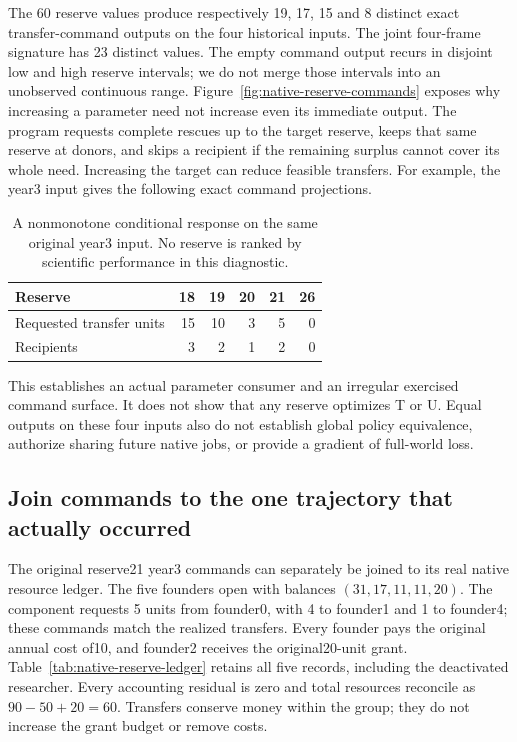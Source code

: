 The 60 reserve values produce respectively 19, 17, 15 and 8 distinct exact
transfer-command outputs on the four historical inputs. The joint four-frame
signature has 23 distinct values. The empty command output recurs in disjoint
low and high reserve intervals; we do not merge those intervals into an
unobserved continuous range. Figure~\ref{fig:native-reserve-commands} exposes
why increasing a parameter need not increase even its immediate output. The
program requests complete rescues up to the target reserve, keeps that same
reserve at donors, and skips a recipient if the remaining surplus cannot
cover its whole need. Increasing the target can reduce feasible transfers.
For example, the year3 input gives the following exact command projections.

\begin{table}[t]
\centering\small
\begin{tabular}{lrrrrr}
\toprule
Reserve &18&19&20&21&26\\
\midrule
Requested transfer units &15&10&3&5&0\\
Recipients &3&2&1&2&0\\
\bottomrule
\end{tabular}
\caption{A nonmonotone conditional response on the same original year3 input.
No reserve is ranked by scientific performance in this diagnostic.}
\label{tab:native-reserve-nonmonotone}
\end{table}

This establishes an actual parameter consumer and an irregular exercised
command surface. It does not show that any reserve optimizes T or U. Equal
outputs on these four inputs also do not establish global policy equivalence,
authorize sharing future native jobs, or provide a gradient of full-world loss.

\subsection{Join commands to the one trajectory that actually occurred}
The original reserve21 year3 commands can separately be joined to its real
native resource ledger. The five founders open with balances
$(31,17,11,11,20)$. The component requests 5 units from founder0, with 4 to
founder1 and 1 to founder4; these commands match the realized transfers.
Every founder pays the original annual cost of10, and founder2 receives the
original20-unit grant. Table~\ref{tab:native-reserve-ledger} retains all five
records, including the deactivated researcher. Every accounting residual is
zero and total resources reconcile as $90-50+20=60$. Transfers conserve money
within the group; they do not increase the grant budget or remove costs.

